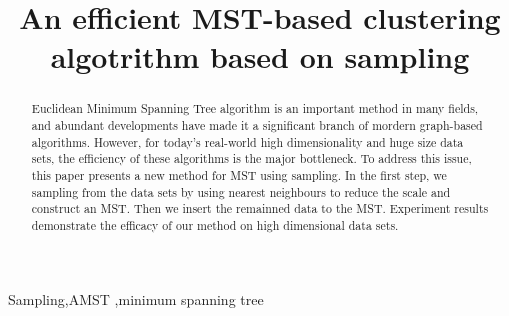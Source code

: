 
\begin{frontmatter}
	\title{An efficient MST-based clustering algotrithm based on sampling}
	\begin{abstract}
		Euclidean Minimum Spanning Tree algorithm is an important method in many fields, and abundant developments have made it a significant branch of mordern graph-based algorithms. However, for today's real-world high dimensionality and huge size data sets, the efficiency of these algorithms is the major bottleneck. To address this issue, this paper presents a new method for MST using sampling. In the first step, we sampling from the data sets by using nearest neighbours to reduce the scale and construct an MST. Then we insert the remainned data to the MST. Experiment results demonstrate the efficacy of our method on high dimensional data sets. 
	\end{abstract}
	
	\begin{keyword}
		Sampling\sep AMST \sep  minimum spanning tree 
	\end{keyword}
\end{frontmatter}
